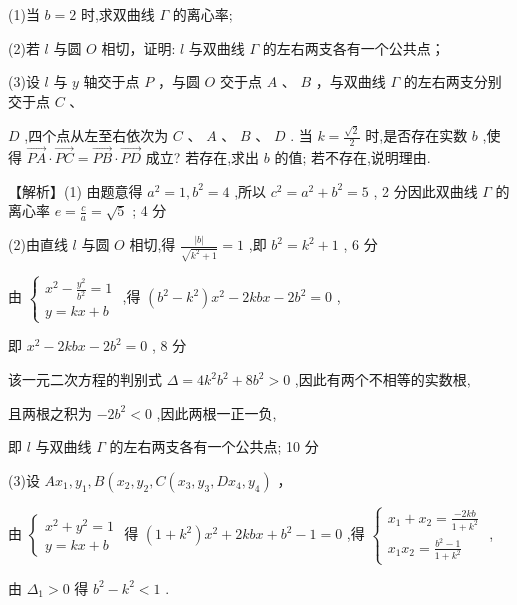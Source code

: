 \documentclass[10pt]{article}
\begin{document}
(1)当 \(b = 2\) 时,求双曲线 \(\Gamma\) 的离心率;

(2)若 \(l\) 与圆 \(O\) 相切，证明: \(l\) 与双曲线 \(\Gamma\) 的左右两支各有一个公共点；

(3)设 \(l\) 与 \(y\) 轴交于点 \(P\) ，与圆 \(O\) 交于点 \(A\) 、 \(B\) ，与双曲线 \(\Gamma\) 的左右两支分别交于点 \(C\) 、

\(D\) ,四个点从左至右依次为 \(C\text{ 、 }A\text{ 、 }B\text{ 、 }D\) . 当 \(k = \frac{\sqrt{2}}{2}\) 时,是否存在实数 \(b\) ,使得 \(\overrightarrow{PA} \cdot  \overrightarrow{PC} = \overrightarrow{PB} \cdot  \overrightarrow{PD}\) 成立? 若存在,求出 \(b\) 的值; 若不存在,说明理由.

【解析】(1) 由题意得 \({a}^{2} = 1,{b}^{2} = 4\) ,所以 \({c}^{2} = {a}^{2} + {b}^{2} = 5\) , 2 分因此双曲线 \(\Gamma\) 的离心率 \(e = \frac{c}{a} = \sqrt{5}\) ; 4 分

(2)由直线 \(l\) 与圆 \(O\) 相切,得 \(\frac{\left| b\right| }{\sqrt{{k}^{2} + 1}} = 1\) ,即 \({b}^{2} = {k}^{2} + 1\) , 6 分

由 \(\left\{  \begin{array}{l} {x}^{2} - \frac{{y}^{2}}{{b}^{2}} = 1 \\  y = {kx} + b \end{array}\right.\) ,得 \(\left( {{b}^{2} - {k}^{2}}\right) {x}^{2} - {2kbx} - 2{b}^{2} = 0\) ,

即 \({x}^{2} - {2kbx} - 2{b}^{2} = 0\) , 8 分

该一元二次方程的判别式 \(\Delta  = 4{k}^{2}{b}^{2} + 8{b}^{2} > 0\) ,因此有两个不相等的实数根,

且两根之积为 \(- 2{b}^{2} < 0\) ,因此两根一正一负,

即 \(l\) 与双曲线 \(\Gamma\) 的左右两支各有一个公共点; 10 分

(3)设 \(A{x}_{1},{y}_{1},B\left( {{x}_{2},{y}_{2},C\left( {{x}_{3},{y}_{3},D{x}_{4},{y}_{4}}\right) }\right.\) ，

由 \(\left\{  \begin{array}{l} {x}^{2} + {y}^{2} = 1 \\  y = {kx} + b \end{array}\right.\) 得 \(\left( {1 + {k}^{2}}\right) {x}^{2} + {2kbx} + {b}^{2} - 1 = 0\) ,得 \(\left\{  \begin{array}{l} {x}_{1} + {x}_{2} = \frac{-{2kb}}{1 + {k}^{2}} \\  {x}_{1}{x}_{2} = \frac{{b}^{2} - 1}{1 + {k}^{2}} \end{array}\right.\) ,

由 \({\Delta }_{1} > 0\) 得 \({b}^{2} - {k}^{2} < 1\) .
\end{document}
